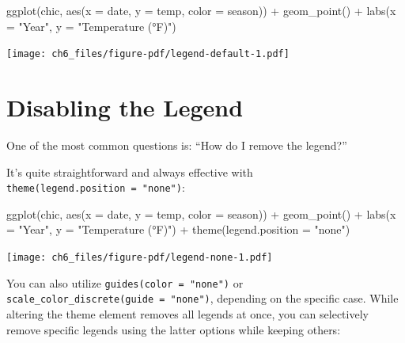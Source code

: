 \documentclass[
  letterpaper,
]{scrbook}
\newenvironment{Shaded}{\begin{snugshade}}{\end{snugshade}}
\newcommand{\AttributeTok}[1]{\textcolor[rgb]{0.40,0.45,0.13}{#1}}
\newcommand{\FunctionTok}[1]{\textcolor[rgb]{0.28,0.35,0.67}{#1}}
\newcommand{\NormalTok}[1]{\textcolor[rgb]{0.00,0.23,0.31}{#1}}
\newcommand{\SpecialCharTok}[1]{\textcolor[rgb]{0.37,0.37,0.37}{#1}}
\newcommand{\StringTok}[1]{\textcolor[rgb]{0.13,0.47,0.30}{#1}}
\begin{document}
\begin{Shaded}
\begin{Highlighting}[]
\FunctionTok{ggplot}\NormalTok{(chic,}
       \FunctionTok{aes}\NormalTok{(}\AttributeTok{x =}\NormalTok{ date, }\AttributeTok{y =}\NormalTok{ temp, }\AttributeTok{color =}\NormalTok{ season)) }\SpecialCharTok{+}
  \FunctionTok{geom\_point}\NormalTok{() }\SpecialCharTok{+}
  \FunctionTok{labs}\NormalTok{(}\AttributeTok{x =} \StringTok{"Year"}\NormalTok{, }\AttributeTok{y =} \StringTok{"Temperature (°F)"}\NormalTok{)}
\end{Highlighting}
\end{Shaded}

\texttt{[image: ch6\_files/figure-pdf/legend-default-1.pdf]}

\section{Disabling the Legend}\label{disabling-the-legend}

One of the most common questions is: ``How do I remove the legend?''

It's quite straightforward and always effective with
\texttt{theme(legend.position\ =\ "none")}:

\begin{Shaded}
\begin{Highlighting}[]
\FunctionTok{ggplot}\NormalTok{(chic,}
       \FunctionTok{aes}\NormalTok{(}\AttributeTok{x =}\NormalTok{ date, }\AttributeTok{y =}\NormalTok{ temp, }\AttributeTok{color =}\NormalTok{ season)) }\SpecialCharTok{+}
  \FunctionTok{geom\_point}\NormalTok{() }\SpecialCharTok{+}
  \FunctionTok{labs}\NormalTok{(}\AttributeTok{x =} \StringTok{"Year"}\NormalTok{, }\AttributeTok{y =} \StringTok{"Temperature (°F)"}\NormalTok{) }\SpecialCharTok{+}
  \FunctionTok{theme}\NormalTok{(}\AttributeTok{legend.position =} \StringTok{"none"}\NormalTok{)}
\end{Highlighting}
\end{Shaded}

\texttt{[image: ch6\_files/figure-pdf/legend-none-1.pdf]}

You can also utilize \texttt{guides(color\ =\ "none")} or
\texttt{scale\_color\_discrete(guide\ =\ "none")}, depending on the
specific case. While altering the theme element removes all legends at
once, you can selectively remove specific legends using the latter
options while keeping others:
\end{document}
